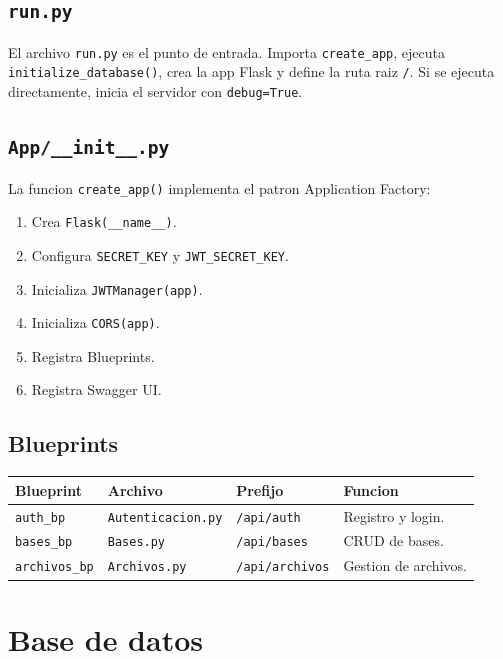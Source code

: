 \documentclass[12pt,a4paper]{article}
\begin{document}
\subsection{\texttt{run.py}}

El archivo \texttt{run.py} es el punto de entrada. Importa \texttt{create\_app}, ejecuta \texttt{initialize\_database()}, crea la app Flask y define la ruta raiz \texttt{/}. Si se ejecuta directamente, inicia el servidor con \texttt{debug=True}.

\subsection{\texttt{App/\_\_init\_\_.py}}

La funcion \texttt{create\_app()} implementa el patron Application Factory:

\begin{enumerate}
    \item Crea \texttt{Flask(\_\_name\_\_)}.
    \item Configura \texttt{SECRET\_KEY} y \texttt{JWT\_SECRET\_KEY}.
    \item Inicializa \texttt{JWTManager(app)}.
    \item Inicializa \texttt{CORS(app)}.
    \item Registra Blueprints.
    \item Registra Swagger UI.
\end{enumerate}

\subsection{Blueprints}

\begin{longtable}{|p{3cm}|p{5cm}|p{3cm}|p{4cm}|}
\hline
\textbf{Blueprint} & \textbf{Archivo} & \textbf{Prefijo} & \textbf{Funcion} \\
\hline
\texttt{auth\_bp} & \texttt{Autenticacion.py} & \texttt{/api/auth} & Registro y login. \\
\hline
\texttt{bases\_bp} & \texttt{Bases.py} & \texttt{/api/bases} & CRUD de bases. \\
\hline
\texttt{archivos\_bp} & \texttt{Archivos.py} & \texttt{/api/archivos} & Gestion de archivos. \\
\hline
\end{longtable}

\section{Base de datos}
\end{document}
